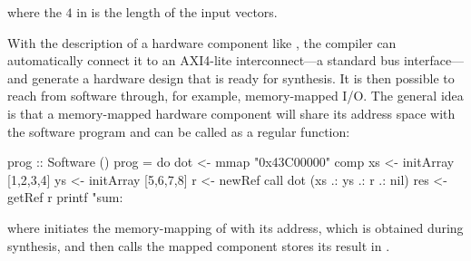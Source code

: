 \documentclass[../paper.tex]{subfiles}
\begin{document}


\noindent where the $4$ in  is the length of the input vectors.


With the description of a hardware component like , the compiler can automatically connect it to an AXI4-lite interconnect---a standard bus interface---and generate a hardware design that is ready for synthesis. It is then possible to reach  from software through, for example, memory-mapped I/O. The general idea is that a memory-mapped hardware component will share its address space with the software program and can be called as a regular function:


\begin{code}
prog :: Software ()
prog = do
  dot <- mmap "0x43C00000" comp
  xs  <- initArray [1,2,3,4]
  ys  <- initArray [5,6,7,8]
  r   <- newRef
  call dot (xs .: ys .: r .: nil)
  res <- getRef r
  printf "sum: %
\end{code}

\noindent where  initiates the memory-mapping of  with its address, which is obtained during synthesis, and  then calls the mapped component stores its result in .

\end{document}
